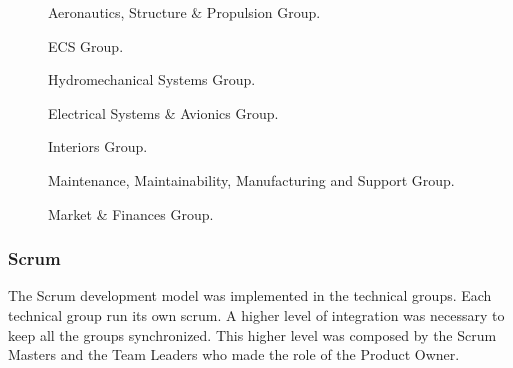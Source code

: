\begin{figure}[H] %
\caption{Aeronautics, Structure \& Propulsion Group.}
\label{fig:AeronauticsGroup}
\end{figure}

\begin{figure}[H] %
\caption{ECS Group.}
\label{fig:ECSGroup}
\end{figure}

\begin{figure}[H] %
\caption{Hydromechanical Systems Group.}
\label{fig:HydromecGroup}
\end{figure}

\begin{figure}[H] %
\caption{Electrical Systems \& Avionics Group.}
\label{fig:ElectricalSystemGroup}
\end{figure}

\begin{figure}[H] %
\caption{Interiors Group.}
\label{fig:ECEPDivisionMembers}
\end{figure}

\begin{figure}[H] %
\caption{Maintenance, Maintainability, Manufacturing and Support Group.}
\label{fig:ECEPDivisionMembers}
\end{figure}

\begin{figure}[H] %
\caption{Market \& Finances Group.}
\label{fig:ECEPDivisionMembers}
\end{figure}



\subsubsection{Scrum}
The Scrum development model was implemented in the technical groups. Each technical group run its own scrum. A higher level of integration was necessary to keep all the groups synchronized. This higher level was composed by the Scrum Masters and the Team Leaders who made the role of the Product Owner.

